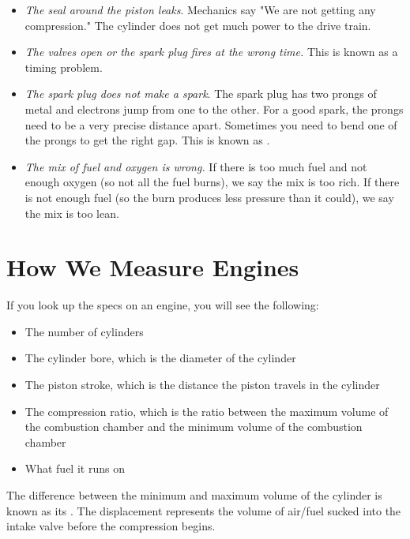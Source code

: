 \begin{itemize}

\item \textit{The seal around the piston leaks}. Mechanics say "We are not getting any compression." The cylinder does not get much power to the drive train.

\item \textit{The valves open or the spark plug fires at the wrong time.} This is known as a timing problem. 

\item \textit{The spark plug does not make a spark}. The spark plug has two prongs of metal and electrons jump from one to the other. For a good spark, the prongs need to be a very precise distance apart. Sometimes you need to bend one of the prongs to get the right gap. This is known as .

\item \textit{The mix of fuel and oxygen is wrong.} If there is too much fuel and not enough oxygen (so not all the fuel burns), we say the mix is too rich. If there is not enough fuel (so the burn produces less pressure than it could), we say the mix is too lean.

\end{itemize}

\section{How We Measure Engines}

If you look up the specs on an engine, you will see the following:

\begin{itemize}
\item The number of cylinders
\item The cylinder bore, which is the diameter of the cylinder
\item The piston stroke, which is the distance the piston travels in the cylinder
\item The compression ratio, which is the ratio between the maximum volume of the combustion chamber and the minimum volume of the combustion chamber
\item What fuel it runs on
\end{itemize}

The difference between the minimum and maximum volume of the cylinder is known as its . The displacement represents the volume of air/fuel sucked into the intake valve 
before the compression begins.

